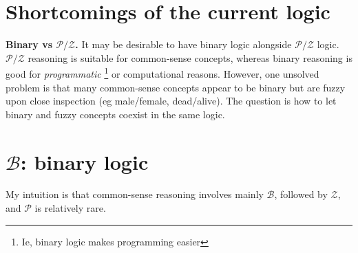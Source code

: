 \section{Shortcomings of the current logic}

\textbf{Binary vs $\mathcal{P/Z}$.}  It may be desirable to have binary logic alongside $\mathcal{P/Z}$ logic.  $\mathcal{P/Z}$ reasoning is suitable for common-sense concepts, whereas binary reasoning is good for \textit{programmatic}
\footnote{Ie, binary logic makes programming easier}
or computational reasons.  However, one unsolved problem is that many common-sense concepts appear to be binary but are fuzzy upon close inspection (eg male/female, dead/alive).  The question is how to let binary and fuzzy concepts coexist in the same logic.

\section{$\mathcal{B}$: binary logic}
\label{sec:binary-logic}

My intuition is that common-sense reasoning involves mainly $\mathcal{B}$, followed by $\mathcal{Z}$, and $\mathcal{P}$ is relatively rare.





